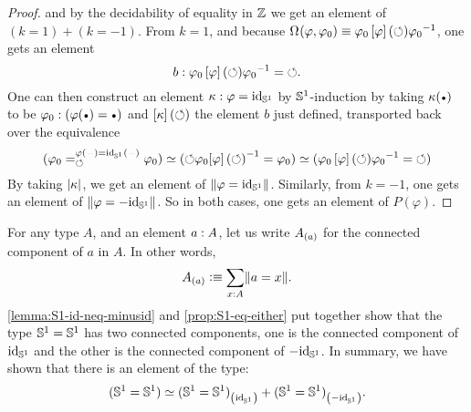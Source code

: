 \documentclass[english,a4]{article}
\renewcommand{\ap}[1]{\left[{#1}\right]}
\begin{document}
\begin{proof}
  and by the decidability of equality in $\mathbb{Z}$ we get an element of $(k=1)+(k=-1)$. 
  From $k=1$, and because
  $\loopspace{} (\varphi,\varphi_0) \jdeq \varphi_0
  \ap\varphi(\Sloop) \inv {\varphi_0}$, one gets an element
  \begin{displaymath}
    b\from \varphi_0 \ap\varphi(\Sloop) \inv {\varphi_0} = \Sloop.
  \end{displaymath}
  One can then construct an element $\kappa: \varphi = \mathord{\mathrm{id}}_{{\mathbb S^{1}}}$ by
  ${{\mathbb S^{1}}}$-induction by taking $\kappa(\base)$ to be
  $\varphi_0 \from (\varphi(\base) = \base)$ and $\ap \kappa(\Sloop)$
  the element $b$ just defined, transported back over the equivalence
  \begin{displaymath}
    (\pathover {\varphi_0} {\varphi(\blank) = \id_\Sc(\blank)} \Sloop {\varphi_0}) \weq
    ( \Sloop \varphi_0 \inv {\ap\varphi(\Sloop)} = \varphi_0)
    \weq (\varphi_0 \ap\varphi(\Sloop) \inv {\varphi_0} = \Sloop)
  \end{displaymath}
  By taking $\lvert\kappa\rvert$, we get an element of
  $\lVert\varphi = \mathord{\mathrm{id}}_{{\mathbb S^{1}}}\rVert$. Similarly, from $k=-1$, one gets an
  element of $\lVert\varphi = -\mathord{\mathrm{id}}_{{\mathbb S^{1}}}\rVert$. So in both cases, one gets
  an element of $P(\varphi)$.
\end{proof}

For any type $A$, and an element $a: A$, let us write ${A}_{\left(a\right)}$
for the connected component of $a$ in $A$. In other words,
\begin{displaymath}
  {A}_{\left(a\right)} \vcentcolon\equiv \sum_{x: A}\lVert a=x\rVert.
\end{displaymath}
\cref{lemma:S1-id-neq-minusid} and \cref{prop:S1-eq-either} put
together show that the type ${{\mathbb S^{1}}}={{\mathbb S^{1}}}$ has two connected components,
one is the connected component of $\mathord{\mathrm{id}}_{{\mathbb S^{1}}}$ and the other is the
connected component of $-\mathord{\mathrm{id}}_{{\mathbb S^{1}}}$. In summary, we have shown that
there is an element of the type:
\begin{displaymath}
  ({{\mathbb S^{1}}}={{\mathbb S^{1}}}) \simeq {({{\mathbb S^{1}}}={{\mathbb S^{1}}})}_{\left(\mathord{\mathrm{id}}_{{\mathbb S^{1}}}\right)} + {({{\mathbb S^{1}}}={{\mathbb S^{1}}})}_{\left(-\mathord{\mathrm{id}}_{{\mathbb S^{1}}}\right)}.
\end{displaymath}
\end{document}
